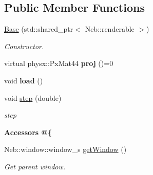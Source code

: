 \subsection*{Public Member Functions}
\begin{DoxyCompactItemize}
\item 
\hypertarget{classNeb_1_1Camera_1_1Projection_1_1Base_a2bf5d7b2b444e405540d1ba3a1dadf87}{\hyperlink{classNeb_1_1Camera_1_1Projection_1_1Base_a2bf5d7b2b444e405540d1ba3a1dadf87}{Base} (std\-::shared\-\_\-ptr$<$ Neb\-::renderable $>$)}\label{classNeb_1_1Camera_1_1Projection_1_1Base_a2bf5d7b2b444e405540d1ba3a1dadf87}

\begin{DoxyCompactList}\small\item\em Constructor. \end{DoxyCompactList}\item 
\hypertarget{classNeb_1_1Camera_1_1Projection_1_1Base_a4101febf5b6540d5e29b9209bcc33f74}{virtual physx\-::\-Px\-Mat44 {\bfseries proj} ()=0}\label{classNeb_1_1Camera_1_1Projection_1_1Base_a4101febf5b6540d5e29b9209bcc33f74}

\item 
\hypertarget{classNeb_1_1Camera_1_1Projection_1_1Base_a4d348ea3fc3134598b02d373a8d081d5}{void {\bfseries load} ()}\label{classNeb_1_1Camera_1_1Projection_1_1Base_a4d348ea3fc3134598b02d373a8d081d5}

\item 
void \hyperlink{classNeb_1_1Camera_1_1Projection_1_1Base_a7a0ef0507f546a0da56bb596de53c962}{step} (double)
\begin{DoxyCompactList}\small\item\em step \end{DoxyCompactList}\end{DoxyCompactItemize}
\begin{Indent}{\bf Accessors @\{}\par
\begin{DoxyCompactItemize}
\item 
\hypertarget{classNeb_1_1Camera_1_1Projection_1_1Base_a341df0c373f2c137f37cc9bfab3d00fd}{Neb\-::window\-::window\-\_\-s \hyperlink{classNeb_1_1Camera_1_1Projection_1_1Base_a341df0c373f2c137f37cc9bfab3d00fd}{get\-Window} ()}\label{classNeb_1_1Camera_1_1Projection_1_1Base_a341df0c373f2c137f37cc9bfab3d00fd}

\begin{DoxyCompactList}\small\item\em Get parent window. \end{DoxyCompactList}\end{DoxyCompactItemize}
\end{Indent}
